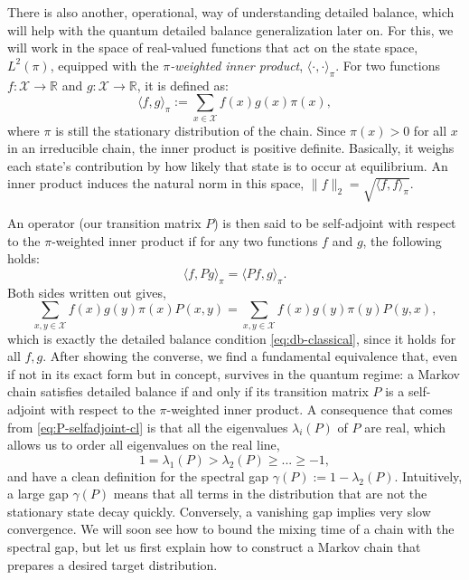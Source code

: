 There is also another, operational, way of understanding detailed balance, which will help with the quantum detailed balance generalization later on. For this, we will work in the space of real-valued functions that act on the state space, $L^2(\pi)$, equipped with the $\pi$\textit{-weighted inner product}, $\langle\cdot,\cdot\rangle_\pi$. For two functions $f: \mathcal{X}\rightarrow \mathbb{R}$ and $g: \mathcal{X}\rightarrow \mathbb{R}$, it is defined as:
\begin{equation}
    \langle f, g\rangle_\pi := \sum_{x\in\mathcal{X}} f(x) g(x) \pi(x),
\end{equation}
where $\pi$ is still the stationary distribution of the chain. Since $\pi(x) > 0$ for all $x$ in an irreducible chain, the inner product is positive definite. Basically, it weighs each state's contribution by how likely that state is to occur at equilibrium. An inner product induces the natural norm in this space, $\|f\|_{2} = \sqrt{\langle f, f \rangle_\pi}$.

An operator (our transition matrix $P$) is then said to be self-adjoint with respect to the $\pi$-weighted inner product  if for any two functions $f$ and $g$, the following holds:
\begin{equation}
    \label{eq:P-selfadjoint-cl}
    \langle f, Pg\rangle_\pi = \langle Pf, g\rangle_\pi.
\end{equation}
Both sides written out gives,
\begin{equation}
    \sum_{x, y\in\mathcal{X}} f(x) g(y) \pi(x) P(x, y) = \sum_{x, y\in\mathcal{X}} f(x) g(y) \pi(y) P(y, x),
\end{equation}
which is exactly the detailed balance condition \eqref{eq:db-classical}, since it holds for all $f, g$. After showing the converse, we find a fundamental equivalence that, even if not in its exact form but in concept, survives in the quantum regime: a Markov chain satisfies detailed balance if and only if its transition matrix $P$ is a self-adjoint with respect to the $\pi$-weighted inner product.  
A consequence that comes from \eqref{eq:P-selfadjoint-cl} is that all the eigenvalues $\lambda_i(P)$ of $P$ are real, which allows us to order all eigenvalues on the real line, 
$$
1 = \lambda_1(P) > \lambda_2(P) \geq ... \geq -1,
$$
and have a clean definition for the spectral gap $\gamma(P) := 1 - \lambda_2(P)$. Intuitively, a large gap $\gamma(P)$ means that all terms in the distribution that are not the stationary state decay quickly. Conversely, a vanishing gap implies very slow convergence. We will soon see how to bound the mixing time of a chain with the spectral gap, but let us first explain how to construct a Markov chain that prepares a desired target distribution.

